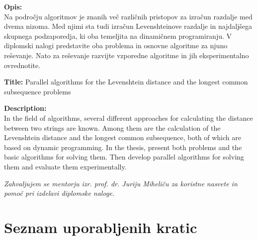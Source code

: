 \documentclass[a4paper,12pt,openright]{book}
\newcommand{\clearemptydoublepage}{\newpage{\pagestyle{empty}\cleardoublepage}}
\begin{document}
\bigskip
\noindent\textbf{Opis:}\\
Na področju algoritmov je znanih več različnih pristopov za izračun razdalje med dvema nizoma. Med njimi sta tudi izračun Levenshteinove razdalje in najdaljšega skupnega podzaporedja, ki oba temeljita na dinamičnem programiranju. V diplomski nalogi predstavite oba problema in osnovne algoritme za njuno reševanje. Nato za reševanje razvijte vzporedne algoritme in jih eksperimentalno ovrednotite.

\bigskip
\noindent\textbf{Title:} Parallel algorithms for the Levenshtein distance and the longest common subsequence problems

\bigskip
\noindent\textbf{Description:}\\
In the field of algorithms, several different approaches for calculating the distance between two strings are known. Among them are the calculation of the Levenshtein distance and the longest common subsequence, both of which are based on dynamic programming. In the thesis, present both problems and the basic algorithms for solving them. Then develop parallel algorithms for solving them and evaluate them experimentally.

\vfill

\vspace{2cm}

\clearemptydoublepage

\thispagestyle{empty}\mbox{}\vfill\null\it%
\noindent
Zahvaljujem se mentorju izr. prof. dr. Juriju Miheliču za koristne nasvete in pomoč pri izdelavi diplomske naloge.
\rm\normalfont

\clearemptydoublepage



\pagestyle{empty}
\def\thepage{}%
\tableofcontents{}

\clearemptydoublepage


\chapter*{Seznam uporabljenih kratic}
\end{document}
